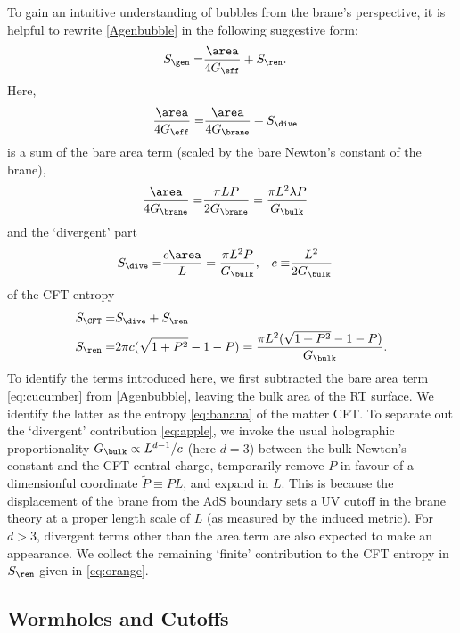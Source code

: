 To gain an intuitive understanding of bubbles from the brane's perspective, it is helpful to rewrite \eqref{Agenbubble} in the following suggestive form:
\begin{align}
  S_\gen
  =& \frac{\area}{4 G_\eff} + S_\ren.
  \label{eq:pear}
\end{align}
Here,
\begin{align}
  \frac{\area}{4 G_\eff}
  =& \frac{\area}{4 G_\brane} + S_\dive
\end{align}
is a sum of the bare area term (scaled by the bare Newton's constant of the brane),
\begin{align}
  \frac{\area}{4 G_\brane}
  =& \frac{\pi L P}{2 G_\brane}
  = \frac{\pi L^2 \lambda P}{G_\bulk}
  \label{eq:cucumber}
\end{align}
and the `divergent' part
\begin{align}
  S_\dive
  =& \frac{c \area}{L}
  = \frac{\pi L^2 P}{G_\bulk},
  &
  c \equiv& \frac{L^2}{2 G_\bulk}
  \label{eq:apple}
\end{align}
of the CFT entropy
\begin{align}
  S_\CFT
  =& S_\dive + S_\ren
  \label{eq:banana}
  \\
  S_\ren
  =& 2\pi c(\sqrt{1+P^2}-1-P)
  = \frac{\pi L^2(\sqrt{1+P^2}-1-P)}{G_\bulk}.
  \label{eq:orange}
\end{align}
To identify the terms introduced here, we first subtracted the bare area term \eqref{eq:cucumber} from \eqref{Agenbubble}, leaving the bulk area of the RT surface. We identify the latter as the entropy \eqref{eq:banana} of the matter CFT. To separate out the `divergent' contribution \eqref{eq:apple}, we invoke the usual holographic proportionality $G_\bulk \propto L^{d-1}/c$ (here $d=3$) between the bulk Newton's constant and the CFT central charge, temporarily remove $P$ in favour of a dimensionful coordinate $\tilde{P}\equiv P L$, and expand in $L$. This is because the displacement of the brane from the AdS boundary sets a UV cutoff in the brane theory at a proper length scale of $L$ (as measured by the induced metric). For $d>3$, divergent terms other than the area term are also expected to make an appearance. We collect the remaining `finite' contribution to the CFT entropy in $S_\ren$ given in \eqref{eq:orange}.


\subsection{Wormholes and Cutoffs}\label{wormy}

